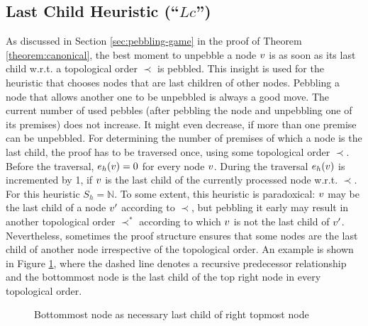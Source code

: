 \subsection{Last Child Heuristic (``$Lc$'')}
\label{sec:lastchild}

As discussed in Section \ref{sec:pebbling-game} in the proof of Theorem \ref{theorem:canonical}, the best moment to unpebble a node $v$ is as soon as its last child w.r.t. a topological order $\prec$ is pebbled. 
This insight is used for the  heuristic that chooses nodes that are last children of other nodes. 
Pebbling a node that allows another one to be unpebbled is always a good move. 
The current number of used pebbles (after pebbling the node and unpebbling one of its premises) does not increase.
It might even decrease, if more than one premise can be unpebbled.
For determining the number of premises of which a node is the last child, the proof has to be traversed once, using some topological order $\prec$.
Before the traversal, $e_h(v) = 0$ for every node $v$. 
During the traversal $e_h(v)$ is incremented by 1, if $v$ is the last child of the currently processed node w.r.t. $\prec$. 
For this heuristic $S_h = \mathbb{N}$.
To some extent, this heuristic is paradoxical: $v$ may be the last child of a node $v'$ according to $\prec$, but pebbling it early may result in another topological order $\prec^*$ according to which $v$ is not the last child of $v'$.
Nevertheless, sometimes the proof structure ensures that some nodes are the last child of another node irrespective of the topological order. An example is shown in Figure \ref{fig:forcedLC}, where the dashed line denotes a recursive predecessor relationship and the bottommost node is the last child of the top right node in every topological order.

\begin{figure}[h]
	\caption{Bottommost node as necessary last child of right topmost node}
	\label{fig:forcedLC}
\end{figure}


